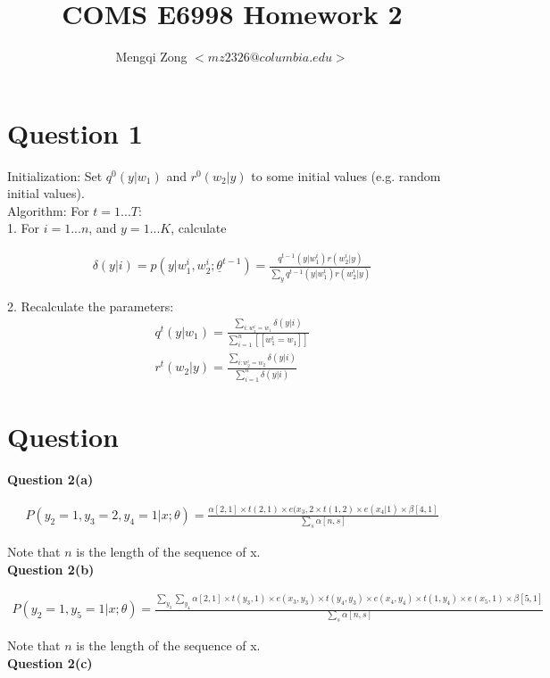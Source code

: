 \documentclass[12pt]{article}
\title{COMS E6998 Homework 2}
\author{Mengqi Zong $<mz2326@columbia.edu>$}
\begin{document}
\maketitle

\setlength{\parindent}{0in}

\section*{Question 1}

Initialization: Set $q^0(y|w_1)$ and $r^0(w_2|y)$ to some initial
values (e.g. random initial values). \\

Algorithm: For $t = 1...T$: \\

1. For $i = 1...n$, and $y = 1...K$, calculate

\begin{eqnarray*}
\delta(y|i)
= p(y|w^i_1, w^i_2; \underline {\theta}^{t-1})
= \frac {q^{t-1}(y|w^i_1) r(w^i_2|y)}
{\sum_y {q^{t-1}(y|w^i_1) r(w^i_2|y)}}
\end{eqnarray*}

2. Recalculate the parameters: \\

\begin{eqnarray*}
q^t(y|w_1) = \frac {\sum_{i:w^i_1 = w_1} \delta (y|i)}
{\sum^n_{i=1} [[w^i_1 = w_1]]} \\
r^t(w_2|y) = \frac {\sum_{i:w^i_2 = w_2} \delta (y|i)}
{\sum^n_{i=1} \delta (y|i)}
\end{eqnarray*}

\section*{Question}

{\bf Question 2(a)}

\begin{eqnarray*}
P(y_2 = 1, y_3 = 2, y_4 = 1 | x; \theta)
= \frac {\alpha[2,1] \times t(2,1) \times e(x_3,2 \times t(1,2) \times
  e(x_4|1) \times \beta[4,1]} {\sum_s \alpha[n,s]}
\end{eqnarray*}

Note that $n$ is the length of the sequence of x. \\

{\bf Question 2(b)}

\begin{eqnarray*}
P(y_2 = 1, y_5 = 1|x; \theta)
= \frac {\sum_{y_3} \sum_{y_4} \alpha[2,1] \times t(y_3, 1) \times
  e(x_3,y_3) \times t(y_4, y_3) \times e(x_4, y_4) \times t(1, y_4)
  \times e(x_5, 1) \times \beta[5, 1]}
{\sum_s \alpha[n, s]}
\end{eqnarray*}

Note that $n$ is the length of the sequence of x. \\

{\bf Question 2(c)}

\begin{eqnarray*}

\end{eqnarray*}
\end{document}
